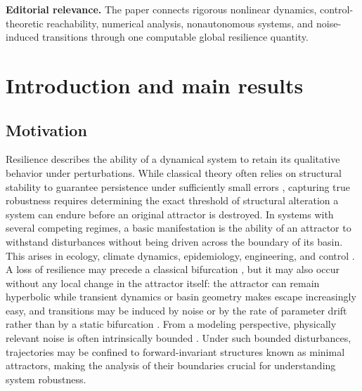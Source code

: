 \documentclass[pdflatex,sn-mathphys-num]{sn-jnl}
\numberwithin{equation}{section}
\theoremstyle{thmstyleone}%
\theoremstyle{definition}
\theoremstyle{remark}
\begin{document}
\vspace{0.75em}
\colorbox{panelblue}{%
  \parbox{\dimexpr\textwidth-2\fboxsep\relax}{%
    {\small\color{pitchgray}
    \textbf{Editorial relevance.}
    The paper connects rigorous nonlinear dynamics, control-theoretic
    reachability, numerical analysis, nonautonomous systems, and noise-induced
    transitions through one computable global resilience quantity.}%
  }%
}
\vspace{2em}
\endgroup
\newpage

\section{Introduction and main results}
\label{sec:introduction}

\subsection{Motivation}
\label{subsec:intro-motivation}

Resilience describes the ability of a dynamical system to retain its qualitative behavior under perturbations. While classical theory often relies on structural stability to guarantee persistence under sufficiently small errors \citep{conley1971isolated}, capturing true robustness requires determining the exact threshold of structural alteration a system can endure before an original attractor is destroyed. In systems with several competing regimes, a basic manifestation is the ability of an attractor to withstand disturbances without being driven across the boundary of its basin. This arises in ecology, climate dynamics, epidemiology, engineering, and control \citep{holling1973resilience,scheffer2001catastrophic,wang2025analysis,lenton2008tipping}. A loss of resilience may precede a classical bifurcation \citep{scheffer2009early,kuehn2011mathematical}, but it may also occur without any local change in the attractor itself: the attractor can remain hyperbolic while transient dynamics or basin geometry makes escape increasingly easy, and transitions may be induced by noise or by the rate of parameter drift rather than by a static bifurcation \citep{ashwin2012tipping,wieczorek2011excitability,wang2025analysis1,ashwin2017parameter}. From a modeling perspective, physically relevant noise is often intrinsically bounded \citep{d2013bounded}. Under such bounded disturbances, trajectories may be confined to forward-invariant structures known as minimal attractors, making the analysis of their boundaries crucial for understanding system robustness.
\end{document}
